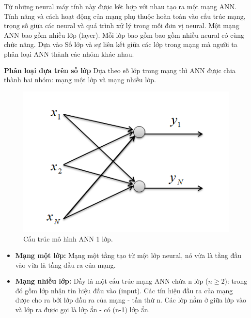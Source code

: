 	Từ những neural máy tính này được kết hợp với nhau tạo ra một mạng ANN. Tính năng và cách hoạt động của mạng phụ thuộc hoàn toàn vào cấu trúc mạng, trọng số giữa các neural và quá trình xử lý trong mỗi đơn vị neural. Một mạng ANN bao gồm nhiều lớp (layer). Mỗi lớp bao gồm bao gồm nhiều neural có cùng chức năng. Dựa vào Số lớp và sự liên kết giữa các lớp trong mạng mà người ta phân loại ANN thành các nhóm khác nhau. \par
	\textbf{Phân loại dựa trên số lớp}
	Dựa theo số lớp trong mạng thì ANN được chia thành hai nhóm: mạng một lớp và mạng nhiều lớp.
	\begin{figure}[ht]
  			\begin{center}
    				
    				\includegraphics[scale=.6]{1layer}
    				\caption{Cấu trúc mô hình ANN 1 lớp.} 
    				\label{1layer}
  			\end{center}
		\end{figure}
	\begin{itemize}
		\item \textbf{Mạng một lớp:} Mạng một tầng tạo từ một lớp neural, nó vừa là tầng đầu vào vừa là tầng đầu ra của mạng.
		
		\item \textbf{Mạng nhiều lớp:} Đầy là một cấu trúc mạng ANN chứa n lớp ($n \ge 2$): trong đó gồm lớp nhận tín hiệu đầu vào (input). Các tín hiệu đầu ra của mạng được cho ra bởi lớp đầu ra của mạng - tần thứ n. Các lớp nằm ở giữa lớp vào và lớp ra được gọi là lớp ẩn - có (n-1) lớp ẩn.   
 	\end{itemize}
	
